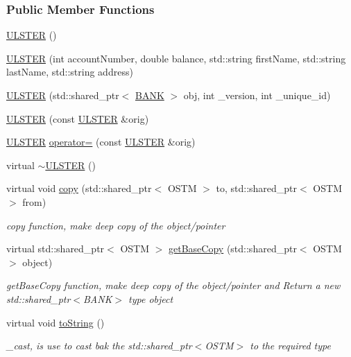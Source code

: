 \subsubsection*{Public Member Functions}
\begin{DoxyCompactItemize}
\item 
\hyperlink{class_u_l_s_t_e_r_a637ad8cb5537167ab51cd079637a8323}{U\+L\+S\+T\+ER} ()
\item 
\hyperlink{class_u_l_s_t_e_r_ad80944864d4f907dd30b02a1d1a563cc}{U\+L\+S\+T\+ER} (int account\+Number, double balance, std\+::string first\+Name, std\+::string last\+Name, std\+::string address)
\item 
\hyperlink{class_u_l_s_t_e_r_ac7207ca64f86ef3081e176deb222805d}{U\+L\+S\+T\+ER} (std\+::shared\+\_\+ptr$<$ \hyperlink{class_b_a_n_k}{B\+A\+NK} $>$ obj, int \+\_\+version, int \+\_\+unique\+\_\+id)
\item 
\hyperlink{class_u_l_s_t_e_r_ad8847497742850609cd4748bbb6d0a8e}{U\+L\+S\+T\+ER} (const \hyperlink{class_u_l_s_t_e_r}{U\+L\+S\+T\+ER} \&orig)
\item 
\hyperlink{class_u_l_s_t_e_r}{U\+L\+S\+T\+ER} \hyperlink{class_u_l_s_t_e_r_aa096fc13a27cf4c4238af3aad8382a13}{operator=} (const \hyperlink{class_u_l_s_t_e_r}{U\+L\+S\+T\+ER} \&orig)
\item 
virtual \hyperlink{class_u_l_s_t_e_r_a4ceb68bdbc806f74f9e55096f8223453}{$\sim$\+U\+L\+S\+T\+ER} ()
\item 
virtual void \hyperlink{class_u_l_s_t_e_r_aeef5c3e20f2a82344b4b83e5ccf4cc40}{copy} (std\+::shared\+\_\+ptr$<$ O\+S\+TM $>$ to, std\+::shared\+\_\+ptr$<$ O\+S\+TM $>$ from)
\begin{DoxyCompactList}\small\item\em copy function, make deep copy of the object/pointer \end{DoxyCompactList}\item 
virtual std\+::shared\+\_\+ptr$<$ O\+S\+TM $>$ \hyperlink{class_u_l_s_t_e_r_ad0c05e562b0c67283edfa4940c9aa728}{get\+Base\+Copy} (std\+::shared\+\_\+ptr$<$ O\+S\+TM $>$ object)
\begin{DoxyCompactList}\small\item\em get\+Base\+Copy function, make deep copy of the object/pointer and Return a new std\+::shared\+\_\+ptr$<$\+B\+A\+N\+K$>$ type object \end{DoxyCompactList}\item 
virtual void \hyperlink{class_u_l_s_t_e_r_a341bbcb3f7d6ef10f30d4734ceed10ee}{to\+String} ()
\begin{DoxyCompactList}\small\item\em \+\_\+cast, is use to cast bak the std\+::shared\+\_\+ptr$<$\+O\+S\+T\+M$>$ to the required type \end{DoxyCompactList}\item 

\end{DoxyCompactItemize}
